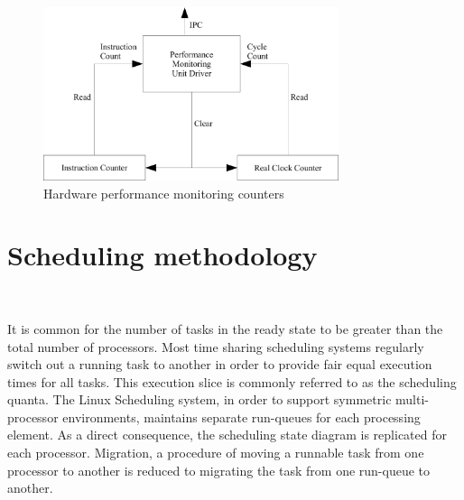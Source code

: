 \begin{figure}[h!]
  \begin{center}
    \includegraphics[height=2in]{figures/HW_Counter.jpg}
    \caption{Hardware performance monitoring counters}
    \label{fig:hw_counters}
  \end{center}
\end{figure}

\section{Scheduling methodology}~\label{sec:pds}

It is common for the number of tasks in the ready state to be greater than the total number
of processors. Most time sharing scheduling systems regularly switch out a running task
to another in order to provide fair equal execution times for all tasks. This execution slice is commonly 
referred to as the scheduling quanta. The Linux Scheduling system, in order to support symmetric 
multi-processor environments, maintains separate run-queues
for each processing element. As a direct consequence, the scheduling state diagram is replicated for each processor. 
Migration, a procedure of moving a runnable task from one processor to another is reduced to migrating the task from
one run-queue to another. 

